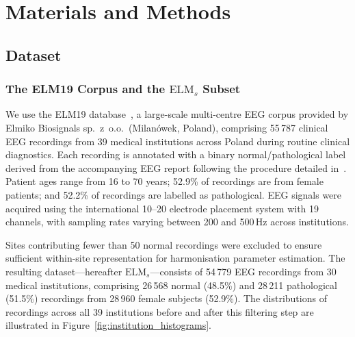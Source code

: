 \documentclass[preprint,12pt]{elsarticle}
\begin{document}
\section{Materials and Methods}
\label{sec:methods}

\subsection{Dataset}
\label{subsec:dataset}

\subsubsection{The ELM19 Corpus and the
  \texorpdfstring{$\mathrm{ELM}_s$}{ELMs} Subset}

We use the ELM19 database~\cite{poziomska2026quantity}, a large-scale
multi-centre EEG corpus provided by Elmiko Biosignals sp.~z~o.o.\
(Milanówek, Poland), comprising 55\,787 clinical EEG recordings from
39 medical institutions across Poland during routine clinical
diagnostics.
Each recording is annotated with a binary normal/pathological label
derived from the accompanying EEG report following the procedure
detailed in~\cite{poziomska2026quantity}.
Patient ages range from 16 to 70 years; 52.9\% of recordings are
from female patients; and 52.2\% of recordings are labelled as
pathological.
EEG signals were acquired using the international 10--20 electrode
placement system with 19 channels, with sampling rates varying
between 200 and 500\,Hz across institutions.

Sites contributing fewer than 50 normal recordings were excluded to
ensure sufficient within-site representation for harmonisation
parameter estimation.
The resulting dataset---hereafter $\mathrm{ELM}_s$---consists of
54\,779 EEG recordings from 30 medical institutions, comprising
26\,568 normal (48.5\%) and 28\,211 pathological (51.5\%) recordings
from 28\,960 female subjects (52.9\%).
The distributions of recordings across all 39 institutions before and
after this filtering step are illustrated in
Figure~\ref{fig:institution_histograms}.
\end{document}
